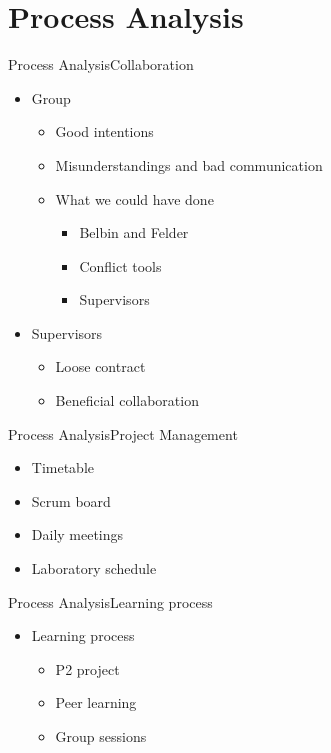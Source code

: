 \section{Process Analysis}
\begin{frame}{Process Analysis}{Collaboration}
\begin{itemize}
    \item Group
    \begin{itemize}
        \item Good intentions
        \item Misunderstandings and bad communication
        \item What we could have done
        \begin{itemize}
            \item Belbin and Felder
            \item Conflict tools
            \item Supervisors
        \end{itemize}
    \end{itemize}
    \item Supervisors
    \begin{itemize}
        \item Loose contract
        \item Beneficial collaboration
    \end{itemize}
\end{itemize}
\end{frame}

\begin{frame}{Process Analysis}{Project Management}
\begin{itemize}
    \item Timetable
    \item Scrum board
    \item Daily meetings
    \item Laboratory schedule
\end{itemize}
\end{frame}

\begin{frame}{Process Analysis}{Learning process}
\begin{itemize}
    \item Learning process
    \begin{itemize}
        \item P2 project
        \item Peer learning
        \item Group sessions
    \end{itemize}
\end{itemize}
    
\end{frame}